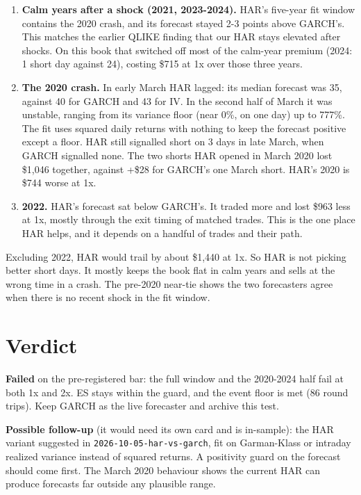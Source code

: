 \documentclass{article}
\begin{document}
\begin{enumerate}

\item \textbf{Calm years after a shock (2021, 2023-2024).} HAR's five-year fit window contains the 2020 crash, and its forecast stayed 2-3 points above GARCH's. This matches the earlier QLIKE finding that our HAR stays elevated after shocks. On this book that switched off most of the calm-year premium (2024: 1 short day against 24), costing \$715 at 1x over those three years.

\item \textbf{The 2020 crash.} In early March HAR lagged: its median forecast was 35, against 40 for GARCH and 43 for IV. In the second half of March it was unstable, ranging from its variance floor (near 0\%, on one day) up to 777\%. The fit uses squared daily returns with nothing to keep the forecast positive except a floor. HAR still signalled short on 3 days in late March, when GARCH signalled none. The two shorts HAR opened in March 2020 lost \$1,046 together, against +\$28 for GARCH's one March short. HAR's 2020 is \$744 worse at 1x.

\item \textbf{2022.} HAR's forecast sat below GARCH's. It traded more and lost \$963 less at 1x, mostly through the exit timing of matched trades. This is the one place HAR helps, and it depends on a handful of trades and their path.

\end{enumerate}

Excluding 2022, HAR would trail by about \$1,440 at 1x. So HAR is not picking better short days. It mostly keeps the book flat in calm years and sells at the wrong time in a crash. The pre-2020 near-tie shows the two forecasters agree when there is no recent shock in the fit window.

\section{Verdict}

\textbf{Failed} on the pre-registered bar: the full window and the 2020-2024 half fail at both 1x and 2x. ES stays within the guard, and the event floor is met (86 round trips). Keep GARCH as the live forecaster and archive this test.

\textbf{Possible follow-up} (it would need its own card and is in-sample): the HAR variant suggested in \texttt{2026-\allowbreak{}10-\allowbreak{}05-\allowbreak{}har-\allowbreak{}vs-\allowbreak{}garch}, fit on Garman-Klass or intraday realized variance instead of squared returns. A positivity guard on the forecast should come first. The March 2020 behaviour shows the current HAR can produce forecasts far outside any plausible range.
\end{document}
